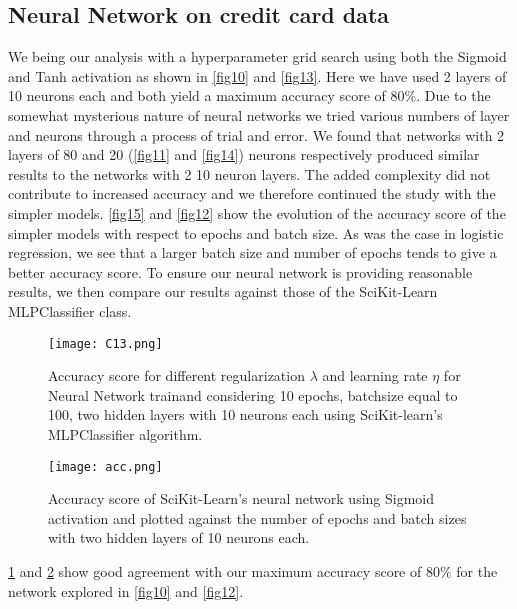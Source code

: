 \documentclass{emulateapj}
\begin{document}
\subsection{Neural Network on credit card data}
We being our analysis with a hyperparameter grid search using both the Sigmoid and Tanh activation as shown in \ref{fig10} and \ref{fig13}. Here we have used 2 layers of 10 neurons each and both yield a maximum accuracy score of $80\%$. Due to the somewhat mysterious nature of neural networks we tried various numbers of layer and neurons through a process of trial and error. We found that networks with 2 layers of 80 and 20 (\ref{fig11} and \ref{fig14}) neurons respectively produced similar results to the networks with 2 10 neuron layers. The added complexity did not contribute to increased accuracy and we therefore continued the study with the simpler models. \ref{fig15} and \ref{fig12} show the evolution of the accuracy score of the simpler models with respect to epochs and batch size. As was the case in logistic regression, we see that a larger batch size and number of epochs tends to give a better accuracy score.
To ensure our neural network is providing reasonable results, we then compare our results against those of the SciKit-Learn MLPClassifier class.
\begin{figure}[H]
    \centering
    \texttt{[image: C13.png]}
    \caption{Accuracy score for different regularization $\lambda$ and learning rate $\eta$ for Neural Network trainand considering 10 epochs, batchsize equal to 100, two hidden layers with 10 neurons each using SciKit-learn's MLPClassifier algorithm.}
    \label{fig20}
\end{figure}

\begin{figure}[h]
    \centering
    \texttt{[image: acc.png]}
    \caption{Accuracy score of SciKit-Learn's neural network using Sigmoid activation and plotted against the number of epochs and batch sizes with two hidden layers of 10 neurons each.}
    \label{fig21}
\end{figure}
\pagebreak
\ref{fig20} and \ref{fig21} show good agreement with our maximum accuracy score of $80\%$ for the network explored in \ref{fig10} and \ref{fig12}.
\end{document}
